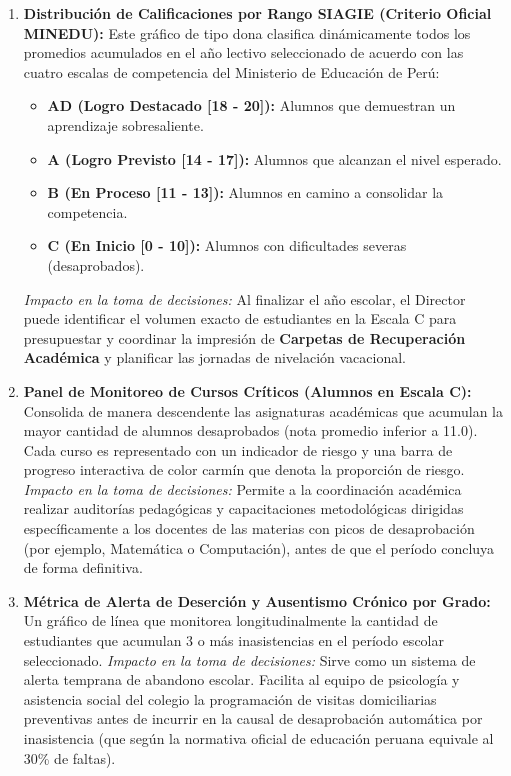 \documentclass[12pt,a4paper,oneside]{report}
\begin{document}
\begin{enumerate}
    \item \textbf{Distribución de Calificaciones por Rango SIAGIE (Criterio Oficial MINEDU):}
    Este gráfico de tipo dona clasifica dinámicamente todos los promedios acumulados en el año lectivo seleccionado de acuerdo con las cuatro escalas de competencia del Ministerio de Educación de Perú:
    \begin{itemize}
        \item \textbf{AD (Logro Destacado [18 - 20]):} Alumnos que demuestran un aprendizaje sobresaliente.
        \item \textbf{A (Logro Previsto [14 - 17]):} Alumnos que alcanzan el nivel esperado.
        \item \textbf{B (En Proceso [11 - 13]):} Alumnos en camino a consolidar la competencia.
        \item \textbf{C (En Inicio [0 - 10]):} Alumnos con dificultades severas (desaprobados).
    \end{itemize}
    \textit{Impacto en la toma de decisiones:} Al finalizar el año escolar, el Director puede identificar el volumen exacto de estudiantes en la Escala C para presupuestar y coordinar la impresión de \textbf{Carpetas de Recuperación Académica} y planificar las jornadas de nivelación vacacional.

    \item \textbf{Panel de Monitoreo de Cursos Críticos (Alumnos en Escala C):}
    Consolida de manera descendente las asignaturas académicas que acumulan la mayor cantidad de alumnos desaprobados (nota promedio inferior a 11.0). Cada curso es representado con un indicador de riesgo y una barra de progreso interactiva de color carmín que denota la proporción de riesgo.
    \textit{Impacto en la toma de decisiones:} Permite a la coordinación académica realizar auditorías pedagógicas y capacitaciones metodológicas dirigidas específicamente a los docentes de las materias con picos de desaprobación (por ejemplo, Matemática o Computación), antes de que el período concluya de forma definitiva.

    \item \textbf{Métrica de Alerta de Deserción y Ausentismo Crónico por Grado:}
    Un gráfico de línea que monitorea longitudinalmente la cantidad de estudiantes que acumulan 3 o más inasistencias en el período escolar seleccionado.
    \textit{Impacto en la toma de decisiones:} Sirve como un sistema de alerta temprana de abandono escolar. Facilita al equipo de psicología y asistencia social del colegio la programación de visitas domiciliarias preventivas antes de incurrir en la causal de desaprobación automática por inasistencia (que según la normativa oficial de educación peruana equivale al 30\% de faltas).


\end{enumerate}
\end{document}

